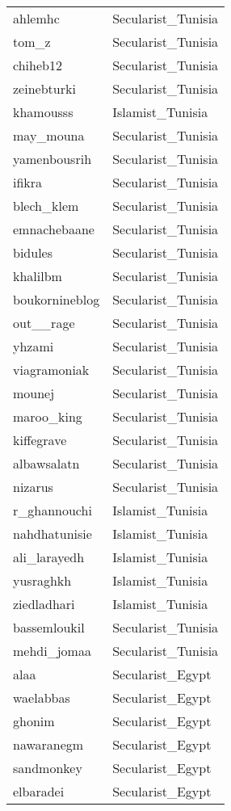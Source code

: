 \begin{longtable}{ll}
  ahlemhc & Secularist\_Tunisia \\ 
  tom\_z & Secularist\_Tunisia \\ 
  chiheb12 & Secularist\_Tunisia \\ 
  zeinebturki & Secularist\_Tunisia \\ 
  khamousss & Islamist\_Tunisia \\ 
  may\_mouna & Secularist\_Tunisia \\ 
  yamenbousrih & Secularist\_Tunisia \\ 
  ifikra & Secularist\_Tunisia \\ 
  blech\_klem & Secularist\_Tunisia \\ 
  emnachebaane & Secularist\_Tunisia \\ 
  bidules & Secularist\_Tunisia \\ 
  khalilbm & Secularist\_Tunisia \\ 
  boukornineblog & Secularist\_Tunisia \\ 
  out\_\_rage & Secularist\_Tunisia \\ 
  yhzami & Secularist\_Tunisia \\ 
  viagramoniak & Secularist\_Tunisia \\ 
  mounej & Secularist\_Tunisia \\ 
  maroo\_king & Secularist\_Tunisia \\ 
  kiffegrave & Secularist\_Tunisia \\ 
  albawsalatn & Secularist\_Tunisia \\ 
  nizarus & Secularist\_Tunisia \\ 
  r\_ghannouchi & Islamist\_Tunisia \\ 
  nahdhatunisie & Islamist\_Tunisia \\ 
  ali\_larayedh & Islamist\_Tunisia \\ 
  yusraghkh & Islamist\_Tunisia \\ 
  ziedladhari & Islamist\_Tunisia \\ 
  bassemloukil & Secularist\_Tunisia \\ 
  mehdi\_jomaa & Secularist\_Tunisia \\ 
  alaa & Secularist\_Egypt \\ 
  waelabbas & Secularist\_Egypt \\ 
  ghonim & Secularist\_Egypt \\ 
  nawaranegm & Secularist\_Egypt \\ 
  sandmonkey & Secularist\_Egypt \\ 
  elbaradei & Secularist\_Egypt \\ 

\end{longtable}
